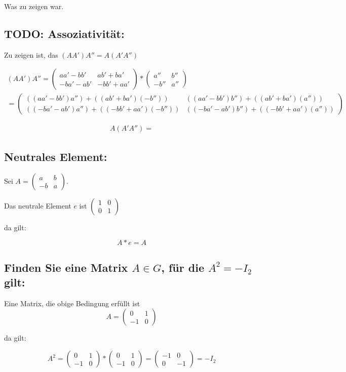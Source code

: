 \documentclass{article}
\begin{document}
Was zu zeigen war.

\subsection*{TODO: Assoziativität:}

Zu zeigen ist, das
\((AA')A''=A(A'A'')\)

\[
\begin{split}
(AA')A''
=
\begin{pmatrix}
  aa'-bb'    & ab' + ba' \\
  -ba' - ab' & -bb' + aa'
\end{pmatrix}
*
\begin{pmatrix}
  a'' & b'' \\
  -b'' & a''
\end{pmatrix}
\\
=
\begin{pmatrix}
  ((aa'-bb')a'') + ((ab' + ba')(-b'')) & ((aa'-bb')b'') + ((ab' + ba')(a'')) \\
  ((-ba'-ab')a'') + ((-bb' + aa')(-b'')) & ((-ba'-ab')b'') +  ((-bb' + aa')(a''))
\end{pmatrix}
\end{split}
\]

\[
\begin{split}
A(A'A'')
=

\end{split}
\]


\subsection*{Neutrales Element:}

Sei
\(
A=
\begin{pmatrix}
a & b \\
-b & a
\end{pmatrix}
\).

Das neutrale Element \(e\) ist
\(
\begin{pmatrix}
1 & 0 \\
0 & 1
\end{pmatrix}
\)

da gilt:

\[A * e = A\]

\subsection*{Finden Sie eine Matrix \(A \in G\), für die \(A^2=-I_{2}\) gilt:}

Eine Matrix, die obige Bedingung erfüllt ist
\[
A =
\begin{pmatrix}
0 & 1 \\
-1 & 0
\end{pmatrix}
\]

da gilt:

\[
A^2
=
\begin{pmatrix}
0 & 1 \\
-1 & 0
\end{pmatrix}
*
\begin{pmatrix}
0 & 1 \\
-1 & 0
\end{pmatrix}
=
\begin{pmatrix}
-1 & 0 \\
0 & -1
\end{pmatrix}
= -I_{2}
\]
\end{document}
